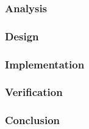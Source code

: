 \subsubsection{Analysis}
%
\subsubsection{Design}
%
\subsubsection{Implementation}
%
\subsubsection{Verification}
%
\subsubsection{Conclusion}

